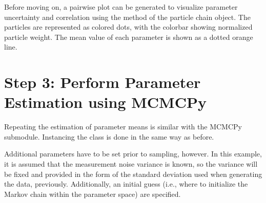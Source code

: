 \documentclass[letterpaper,10pt,english]{sphinxmanual}
\begin{document}
Before moving on, a pairwise plot can be generated to visualize parameter uncertainty and correlation using the  method of the particle chain object. The particles are represented as colored dots, with the colorbar showing normalized particle weight. The mean value of each parameter is shown as a dotted orange line.

\begin{sphinxVerbatim}[commandchars=\\\{\}]
 
\end{sphinxVerbatim}

\begin{figure}[htbp]
\centering

\noindent{}
\end{figure}


\section{Step 3: Perform Parameter Estimation using MCMCPy}
\label{\detokenize{example:step-3-perform-parameter-estimation-using-mcmcpy}}
Repeating the estimation of parameter means is similar with the MCMCPy submodule. Instancing the  class is done in the same way as before.

\begin{sphinxVerbatim}[commandchars=\\\{\}]
    
\end{sphinxVerbatim}

Additional parameters have to be set prior to sampling, however. In this
example, it is assumed that the measurement noise variance is known, so the
variance will be fixed and provided in the form of the standard deviation used
when generating the data, previously. Additionally, an initial guess (i.e.,
where to initialize the Markov chain within the parameter space) are specified.

\begin{sphinxVerbatim}[commandchars=\\\{\}]
     
  
\end{sphinxVerbatim}
\end{document}
